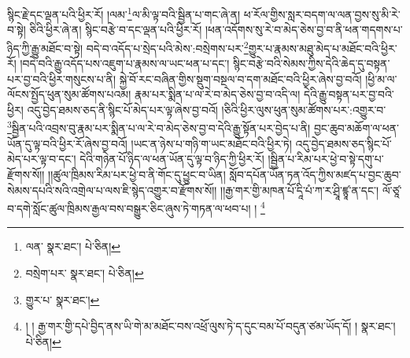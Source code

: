 སྙིང་རྗེ་དང་ལྡན་པའི་ཕྱིར་རོ། །ལམ་\footnote{ལན་  སྣར་ཐང་།  པེ་ཅིན། }ལ་མི་ལྟ་བའི་སྦྱིན་པ་གང་ཞེ་ན། ཕ་རོལ་གྱིས་སླར་བདག་ལ་ལན་བྱས་སུ་མི་རེ་བ་སྟེ། ཅིའི་ཕྱིར་ཞེ་ན། སྙིང་བརྩེ་བ་དང་ལྡན་པའི་ཕྱིར་རོ། །ཕན་འདོགས་སུ་རེ་བ་མེད་ཅེས་བྱ་བ་ནི་ཕན་གདགས་པ་ཉིད་ཀྱི་རྒྱུ་མཐོང་བ་སྟེ། བདེ་བ་འདོད་པ་སྲེད་པའི་མེས་:བསྲེགས་པར་\footnote{བསྲེག་པར་  སྣར་ཐང་།  པེ་ཅིན། }གྱུར་པ་རྣམས་མཐུ་མེད་པ་མཐོང་བའི་ཕྱིར་རོ། །བདེ་བའི་རྒྱུ་འདོད་པས་འཇུག་པ་རྣམས་ལ་ཡང་ཕན་པ་དང་། སྙིང་བརྩེ་བའི་སེམས་ཀྱིས་དེའི་ཆེད་དུ་བསྟན་པར་བྱ་བའི་ཕྱིར་གསུངས་པ་ནི། སྐྱེ་བོ་རང་བཞིན་གྱིས་སྡུག་བསྔལ་བ་དག་མཐོང་བའི་ཕྱིར་ཞེས་བྱ་བའོ། །ཕྱི་མ་ལ་ལོངས་སྤྱོད་ཕུན་སུམ་ཚོགས་པའམ། རྣམ་པར་སྨིན་པ་ལ་རེ་བ་མེད་ཅེས་བྱ་བ་འདི་ལ། དེའི་རྒྱུ་བསྟན་པར་བྱ་བའི་ཕྱིར། འདུ་བྱེད་ཐམས་ཅད་ནི་སྙིང་པོ་མེད་པར་ལྟ་ཞེས་བྱ་བའོ། །ཅིའི་ཕྱིར་ལུས་ཕུན་སུམ་ཚོགས་པར་:འགྱུར་བ་\footnote{གྱུར་པ་  སྣར་ཐང་། }སྦྱིན་པའི་འབྲས་བུ་རྣམ་པར་སྨིན་པ་ལ་རེ་བ་མེད་ཅེས་བྱ་བ་དེའི་རྒྱུ་སྟོན་པར་བྱེད་པ་ནི། བྱང་ཆུབ་མཆོག་ལ་ཕན་ཡོན་དུ་ལྟ་བའི་ཕྱིར་རོ་ཞེས་བྱ་བའོ། །ཡང་ན་ཉེས་པ་གཉི་ག་ཡང་མཐོང་བའི་ཕྱིར་ཏེ། འདུ་བྱེད་ཐམས་ཅད་སྙིང་པོ་མེད་པར་ལྟ་བ་དང་། དེའི་གཉེན་པོ་ཉིད་ལ་ཕན་ཡོན་དུ་ལྟ་བ་ཉིད་ཀྱི་ཕྱིར་རོ། །སྦྱིན་པ་རིམ་པར་ཕྱེ་བ་སྟེ་དགུ་པ་རྫོགས་སོ།། །།ཚུལ་ཁྲིམས་རིམ་པར་ཕྱེ་བ་ནི་གོང་དུ་ཕྱུང་བ་ཡིན། སློབ་དཔོན་ཡོན་ཏན་འོད་ཀྱིས་མཛད་པ་བྱང་ཆུབ་སེམས་དཔའི་སའི་འགྲེལ་པ་ལས་ཇི་སྙེད་འགྱུར་བ་རྫོགས་སོ།། །།རྒྱ་གར་གྱི་མཁན་པོ་དཱི་པཾ་ཀ་ར་ཤྲཱི་ཛྙཱ་ན་དང་། ལོ་ཙཱ་བ་དགེ་སློང་ཚུལ་ཁྲིམས་རྒྱལ་བས་བསྒྱུར་ཅིང་ཞུས་ཏེ་གཏན་ལ་ཕབ་པ། ། \footnote{། ། རྒྱ་གར་གྱི་དཔེ་བྱིད་ནས་ཡི་གེ་མ་མཐོང་བས་འཕྲོ་ལུས་ཏེ་ད་དུང་བམ་པོ་བདུན་ཙམ་ཡོད་དོ། །  སྣར་ཐང་།  པེ་ཅིན། }